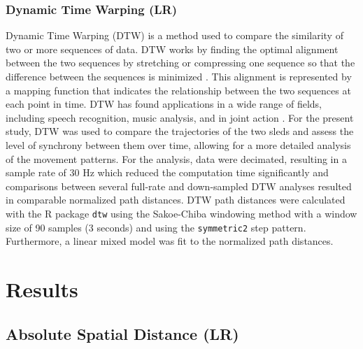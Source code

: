 \documentclass[10pt,a4paper,onecolumn]{article}
\begin{document}
\hypertarget{dynamic-time-warping-lr}{%
\subsubsection{Dynamic Time Warping (LR)}\label{dynamic-time-warping-lr}}

Dynamic Time Warping (DTW) is a method used to compare the similarity of two or more sequences of data. DTW works by finding the optimal alignment between the two sequences by stretching or compressing one sequence so that the difference between the sequences is minimized \autocite{mullerDynamicTimeWarping2007}. This alignment is represented by a mapping function that indicates the relationship between the two sequences at each point in time. DTW has found applications in a wide range of fields, including speech recognition, music analysis, and in joint action \autocite{hochDancingTogetherInfant2021}. For the present study, DTW was used to compare the trajectories of the two sleds and assess the level of synchrony between them over time, allowing for a more detailed analysis of the movement patterns. For the analysis, data were decimated, resulting in a sample rate of 30 Hz which reduced the computation time significantly and comparisons between several full-rate and down-sampled DTW analyses resulted in comparable normalized path distances. DTW path distances were calculated with the R package \texttt{dtw} \autocite{R-dtw} using the Sakoe-Chiba windowing method \autocite{gelerDynamicTimeWarping2019} with a window size of 90 samples (3 seconds) and using the \texttt{symmetric2} step pattern. Furthermore, a linear mixed model was fit to the normalized path distances.

\hypertarget{results}{%
\section{Results}\label{results}}

\hypertarget{absolute-spatial-distance-lr-1}{%
\subsection{Absolute Spatial Distance (LR)}\label{absolute-spatial-distance-lr-1}}
\end{document}
